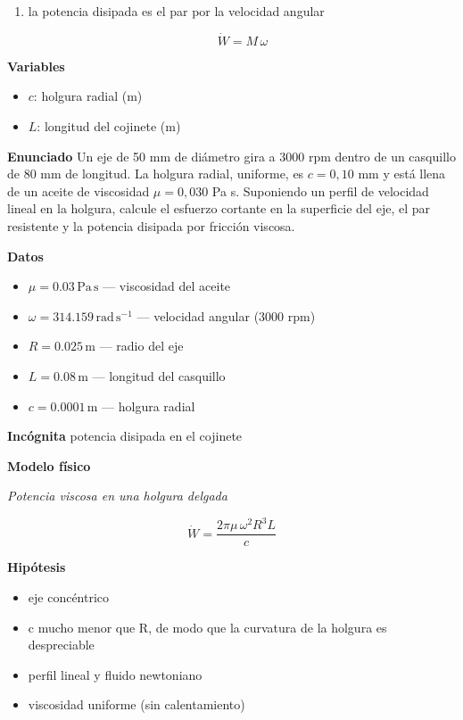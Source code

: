 \documentclass[10pt,openany]{book}
\begin{document}
\begin{tcolorbox}[title={Desarrollos del modelo}, studiumdef, breakable]
\begin{enumerate}
\[
M = \tau\,(2\pi R L)\,R
\]
\item
la potencia disipada es el par por la velocidad angular

\[
\dot W = M\,\omega
\]
\end{enumerate}

\noindent\textbf{Variables}
\begin{itemize}
\item $c$: holgura radial ($\mathrm{m}$)
\item $L$: longitud del cojinete ($\mathrm{m}$)
\end{itemize}


\end{tcolorbox}

\begin{tcolorbox}[title={Problema resuelto}, studiumworked, breakable]

\noindent\textbf{Enunciado}
Un eje de 50 mm de diámetro gira a 3000 rpm dentro de un casquillo de 80 mm de longitud. La holgura radial, uniforme, es \(c = 0{,}10\) mm y está llena de un aceite de viscosidad \(\mu = 0{,}030\) Pa s. Suponiendo un perfil de velocidad lineal en la holgura, calcule el esfuerzo cortante en la superficie del eje, el par resistente y la potencia disipada por fricción viscosa.

\noindent\textbf{Datos}
\begin{itemize}
\item $\mu = 0.03\,\mathrm{Pa}\,\mathrm{s}$ — viscosidad del aceite
\item $\omega = 314.159\,\mathrm{rad}\,\mathrm{s}^{-1}$ — velocidad angular (3000 rpm)
\item $R = 0.025\,\mathrm{m}$ — radio del eje
\item $L = 0.08\,\mathrm{m}$ — longitud del casquillo
\item $c = 0.0001\,\mathrm{m}$ — holgura radial
\end{itemize}

\noindent\textbf{Incógnita}
potencia disipada en el cojinete

\noindent\textbf{Modelo físico}

\noindent\textit{Potencia viscosa en una holgura delgada}

\[
\dot W = \frac{2\pi\mu\,\omega^{2} R^{3} L}{c}
\]

\noindent\textbf{Hipótesis}
\begin{itemize}
\item eje concéntrico
\item c mucho menor que R, de modo que la curvatura de la holgura es despreciable
\item perfil lineal y fluido newtoniano
\item viscosidad uniforme (sin calentamiento)
\end{itemize}


\end{tcolorbox}
\end{document}
